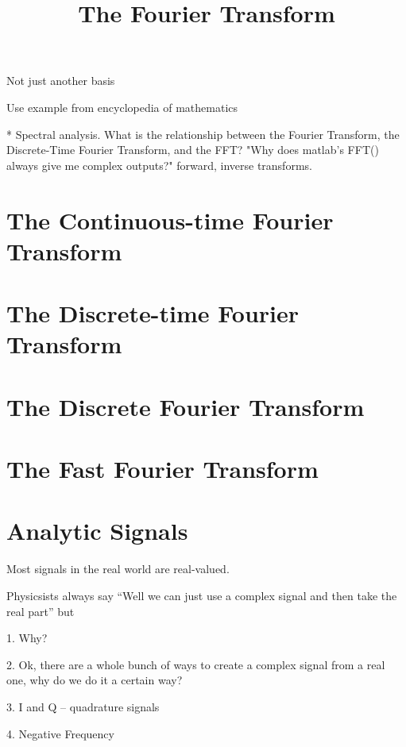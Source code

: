 

\title{The Fourier Transform}

\maketitle

Not just another basis

Use example from encyclopedia of mathematics


* Spectral analysis. What is the relationship between the Fourier
  Transform, the Discrete-Time Fourier Transform, and the FFT? "Why
  does matlab’s FFT() always give me complex outputs?" forward,
  inverse transforms.


\section{The Continuous-time Fourier Transform}


\section{The Discrete-time Fourier Transform}


\section{The Discrete Fourier Transform}


\section{The Fast Fourier Transform}


\section{Analytic Signals}
Most signals in the real world are real-valued. 

Physicsists always say ``Well we can just use a complex signal and
then take the real part'' but

1. Why? 

2. Ok, there are a whole bunch of ways to create a complex signal from
a real one, why do we do it a certain way? 

3. I and Q -- quadrature signals

4. Negative Frequency





